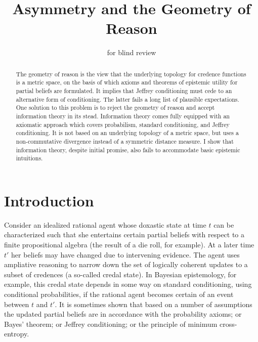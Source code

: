 \documentclass[12pt]{article}
\begin{document}


\title{Asymmetry and the Geometry of Reason}
\author{for blind review}
\date{}
\maketitle

\maketitle

\begin{abstract}
  {\noindent}The geometry of reason is the view that the underlying
  topology for credence functions is a metric space, on the basis of
  which axioms and theorems of epistemic utility for partial beliefs
  are formulated. It implies that Jeffrey conditioning must cede to an
  alternative form of conditioning. The latter fails a long list of
  plausible expectations. One solution to this problem is to reject
  the geometry of reason and accept information theory in its stead.
  Information theory comes fully equipped with an axiomatic approach
  which covers probabilism, standard conditioning, and Jeffrey
  conditioning. It is not based on an underlying topology of a metric
  space, but uses a non-commutative divergence instead of a symmetric
  distance measure. I show that information theory, despite initial
  promise, also fails to accommodate basic epistemic intuitions.
\end{abstract}

\section{Introduction}
\label{intr}

Consider an idealized rational agent whose doxastic state at time $t$
can be characterized such that she entertains certain partial beliefs
with respect to a finite propositional algebra (the result of a die
roll, for example). At a later time $t'$ her beliefs may have changed
due to intervening evidence. The agent uses ampliative reasoning to
narrow down the set of logically coherent updates to a subset of
credences (a so-called credal state). In Bayesian epistemology, for
example, this credal state depends in some way on standard
conditioning, using conditional probabilities, if the rational agent
becomes certain of an event between $t$ and $t'$. It is sometimes
shown that based on a number of assumptions the updated partial
beliefs are in accordance with the probability axioms; or Bayes'
theorem; or Jeffrey conditioning; or the principle of minimum
cross-entropy.
\end{document}
